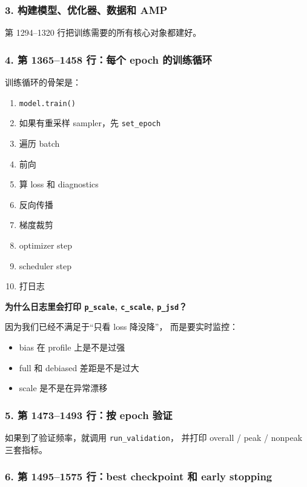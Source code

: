 \documentclass[11pt,a4paper]{ctexart}
\begin{document}
\subsubsection*{3. 构建模型、优化器、数据和 AMP}

第 1294--1320 行把训练需要的所有核心对象都建好。

\subsubsection*{4. 第 1365--1458 行：每个 epoch 的训练循环}

训练循环的骨架是：

\begin{enumerate}[leftmargin=2em]
\item \texttt{model.train()}
\item 如果有重采样 sampler，先 \texttt{set\_epoch}
\item 遍历 batch
\item 前向
\item 算 loss 和 diagnostics
\item 反向传播
\item 梯度裁剪
\item optimizer step
\item scheduler step
\item 打日志
\end{enumerate}

\textbf{为什么日志里会打印 \texttt{p\_scale}, \texttt{c\_scale}, \texttt{p\_jsd}？}

因为我们已经不满足于“只看 loss 降没降”，
而是要实时监控：

\begin{itemize}[leftmargin=2em]
\item bias 在 profile 上是不是过强
\item full 和 debiased 差距是不是过大
\item scale 是不是在异常漂移
\end{itemize}

\subsubsection*{5. 第 1473--1493 行：按 epoch 验证}

如果到了验证频率，就调用 \texttt{run\_validation}，
并打印 overall / peak / nonpeak 三套指标。

\subsubsection*{6. 第 1495--1575 行：best checkpoint 和 early stopping}
\end{document}
